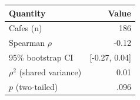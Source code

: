 \begin{tabular}{lr}
\toprule
Quantity & Value \\
\midrule
Cafes (n) & 186 \\
Spearman $\rho$ & -0.12 \\
95\% bootstrap CI & [-0.27, 0.04] \\
$\rho^2$ (shared variance) & 0.01 \\
$p$ (two-tailed) & .096 \\
\bottomrule
\end{tabular}
